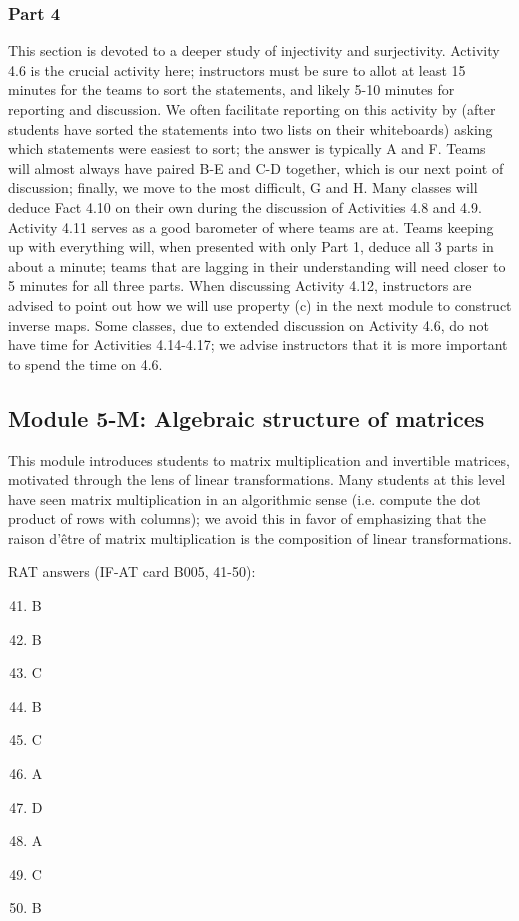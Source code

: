 \documentclass{article}
\begin{document}
\subsubsection*{Part 4}
This section is devoted to a deeper study of injectivity and surjectivity.  Activity 4.6 is the crucial activity here; instructors must be sure to allot at least 15 minutes for the teams to sort the statements, and likely 5-10 minutes for reporting and discussion.  We often facilitate reporting on this activity by (after students have sorted the statements into two lists on their whiteboards) asking which statements were easiest to sort; the answer is typically A and F.  Teams will almost always have paired B-E and C-D together, which is our next point of discussion; finally, we move to the most difficult, G and H.  Many classes will deduce Fact 4.10 on their own during the discussion of Activities 4.8 and 4.9.  Activity 4.11 serves as a good barometer of where teams are at.  Teams keeping up with everything will, when presented with only Part 1, deduce all 3 parts in about a minute; teams that are lagging in their understanding will need closer to 5 minutes for all three parts.  When discussing Activity 4.12, instructors are advised to point out how we will use property (c) in the next module to construct inverse maps.  Some classes, due to extended discussion on Activity 4.6, do not have time for Activities 4.14-4.17; we advise instructors that it is more important to spend the time on 4.6.

\subsection*{Module 5-M: Algebraic structure of matrices}
This module introduces students to matrix multiplication and invertible matrices, motivated through the lens of linear transformations.  Many students at this level have seen matrix multiplication in an algorithmic sense (i.e. compute the dot product of rows with columns); we avoid this in favor of emphasizing that the raison d'\^{e}tre of matrix multiplication is the composition of linear transformations.


RAT answers (IF-AT card B005, 41-50):
\begin{multicols}{10}
\begin{enumerate}[1)]
\setcounter{enumi}{40}
\item B
\item B
\item C
\item B
\item C
\item A
\item D
\item A
\item C
\item B
\end{enumerate}
\end{multicols}
\end{document}
